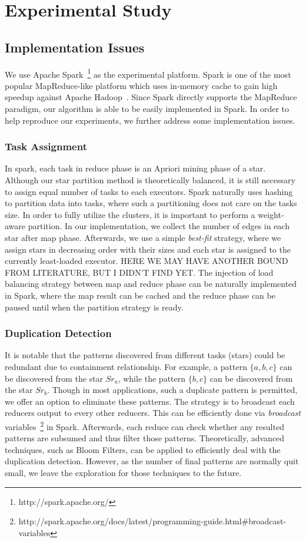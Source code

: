 \section{Experimental Study}
\label{sec:experiment}
\subsection{Implementation Issues}
We use Apache Spark~\footnote{http://spark.apache.org/} as the experimental
platform. Spark is one of the most popular MapReduce-like platform which
uses in-memory cache to gain high speedup against Apache Hadoop~\cite{}. Since
Spark directly supports the MapReduce paradigm, our algorithm is able to 
be easily implemented in Spark. In order to help reproduce our experiments,
we further address some implementation issues.
\subsubsection{Task Assignment}
In spark, each task in reduce phase is an Apriori mining phase of 
a star.
Although our star partition method is theoretically balanced, 
it is still necessary to assign equal number of tasks to each executors. 
Spark naturally uses hashing to partition data into tasks, where such
a partitioning does not care on the tasks size. In order to
fully utilize the clusters, it is important to perform a weight-aware
partition. In our implementation, we collect the number of edges
in each star after map phase. Afterwards, we use a simple \emph{best-fit} strategy,
where we assign stars in decreasing order with their sizes and each star
is assigned to the currently least-loaded executor.  HERE WE MAY HAVE ANOTHER BOUND
FROM LITERATURE, BUT I DIDN'T FIND YET. The injection of load balancing strategy
between map and reduce phase can be naturally implemented in Spark, where the 
map result can be cached and the reduce phase can be paused until when the
partition strategy is ready.

\subsubsection{Duplication Detection}
It is notable that the patterns discovered from different tasks (stars) could
be redundant due to containment relationship. For example, a pattern $\{a,b,c\}$
can be discovered from the star $Sr_a$, while the pattern $\{b,c\}$ can be discovered
from the star $Sr_b$. Though in most applications, such a duplicate pattern
is permitted, we offer an option to eliminate these patterns. The strategy is 
to broadcast each reducers output to every other reducers. This can be
efficiently done via \emph{broadcast} variables~\footnote{http://spark.apache.org/docs/latest/programming-guide.html\#broadcast-variables} in Spark. Afterwards, each reduce can check 
whether any resulted patterns are subsumed and thus filter those patterns.
Theoretically, advanced techniques, such as Bloom Filters, can be applied to efficiently
deal with the duplication detection. However, as the number of final patterns are
normally quit small, we leave the exploration for those techniques to the future.

